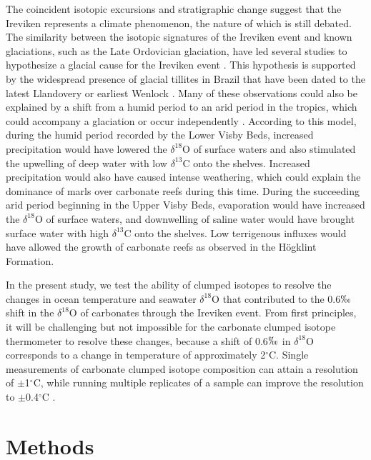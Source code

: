 \documentclass[5p, authoryear]{elsarticle}
\begin{document}
The coincident isotopic excursions and stratigraphic change suggest that the Ireviken represents a climate phenomenon, the nature of which is still debated. The similarity between the isotopic signatures of the Ireviken event and known glaciations, such as the Late Ordovician glaciation, have led several studies to hypothesize a glacial cause for the Ireviken event \citep{Azmy1998, Kaljo2003, Brand2006, Calner2008}. This hypothesis is supported by the widespread presence of glacial tillites in Brazil that have been dated to the latest Llandovery or earliest Wenlock \citep{Grahn1992}. Many of these observations could also be explained by a shift from a humid period to an arid period in the tropics, which could accompany a glaciation or occur independently \citep{Bickert1997, Munnecke2003, Samtleben1996}. According to this model, during the humid period recorded by the Lower Visby Beds, increased precipitation would have lowered the $\delta^{18}$O of surface waters and also stimulated the upwelling of deep water with low $\delta^{13}$C onto the shelves. Increased precipitation would also have caused intense weathering, which could explain the dominance of marls over carbonate reefs during this time. During the succeeding arid period beginning in the Upper Visby Beds, evaporation would have increased the $\delta^{18}$O of surface waters, and downwelling of saline water would have brought surface water with high $\delta^{13}$C onto the shelves. Low terrigenous influxes would have allowed the growth of carbonate reefs as observed in the H\"{o}gklint Formation.

In the present study, we test the ability of clumped isotopes to resolve the changes in ocean temperature and seawater $\delta^{18}$O that contributed to the 0.6$\permil$ shift in the $\delta^{18}$O of carbonates through the Ireviken event. From first principles, it will be challenging but not impossible for the carbonate clumped isotope thermometer to resolve these changes, because a shift of 0.6$\permil$ in $\delta^{18}$O corresponds to a change in temperature of approximately 2$^{\circ}$C. Single measurements of carbonate clumped isotope composition can attain a resolution of $\pm$1$^{\circ}$C, while running multiple replicates of a sample can improve the resolution to $\pm$0.4$^{\circ}$C \citep{Thiagarajan2011}.

\section{Methods}
\end{document}
